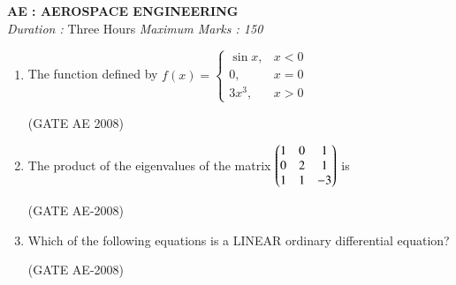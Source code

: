 \documentclass[journal,12pt,onecolumn]{IEEEtran}
\theoremstyle{remark}
\begin{document}
\begin{center}
    \textbf{\Large AE : AEROSPACE ENGINEERING} \\[1ex]
    \textit{Duration :} Three Hours \hfill \textit{Maximum Marks : 150}
\end{center}

\quad

\quad

\begin{enumerate}
  
\item The function defined by
$
f(x) = \begin{cases}
\sin x, & x < 0 \\
0, & x = 0 \\
3x^3, & x > 0
\end{cases}
$

\begin{enumerate}
\end{enumerate}

\hfill(GATE AE 2008)
\quad

\item The product of the eigenvalues of the matrix
$
\begin{pmatrix}
1 & 0 & 1 \\
0 & 2 & 1 \\
1 & 1 & -3
\end{pmatrix}
$
is 
\begin{enumerate}
\end{enumerate}
\hfill(GATE AE-2008)
\quad

\item Which of the following equations is a LINEAR ordinary differential equation?

\begin{enumerate}
\end{enumerate}
\hfill(GATE AE-2008)
\quad


\end{enumerate}
\end{document}
